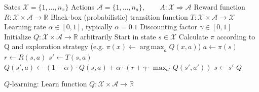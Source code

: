 \documentclass{article}
\DeclareMathOperator*{\argmax}{arg\,max}
\begin{document}
\begin{preview}
    \begin{algorithm}[H]
        \begin{algorithmic}
        \Require
        \Statex Sates $\mathcal{X} = \{1, \dots, n_x\}$
        \Statex Actions $\mathcal{A} = \{1, \dots, n_a\},\qquad A: \mathcal{X} \Rightarrow \mathcal{A}$
        \Statex Reward function $R: \mathcal{X} \times \mathcal{A} \rightarrow \mathbb{R}$
        \Statex Black-box (probabilistic) transition function $T: \mathcal{X} \times \mathcal{A} \rightarrow \mathcal{X}$
        \Statex Learning rate $\alpha \in [0, 1]$, typically $\alpha = 0.1$
        \Statex Discounting factor $\gamma \in [0, 1]$
            \State Initialize $Q: \mathcal{X} \times \mathcal{A} \rightarrow \mathbb{R}$ arbitrarily
                \State Start in state $s \in \mathcal{X}$
                    \State Calculate $\pi$ according to Q and exploration strategy (e.g. $\pi(x) \gets \argmax_{a} Q(x, a)$)
                    \State $a \gets \pi(s)$
                    \State $r \gets R(s, a)$
                    \State $s' \gets T(s, a)$ 
                    \State $Q(s', a) \gets (1 - \alpha) \cdot Q(s, a) + \alpha \cdot (r + \gamma \cdot \max_{a'} Q(s', a'))$
                    \State $s \gets s'$
                \EndWhile
            \EndWhile
            \Return $Q$
        \EndProcedure
        \end{algorithmic}
    \caption{$Q$-learning: Learn function $Q: \mathcal{X} \times \mathcal{A} \rightarrow \mathbb{R}$}
    \label{alg:q-learning}
    \end{algorithm}
\end{preview}
\end{document}
